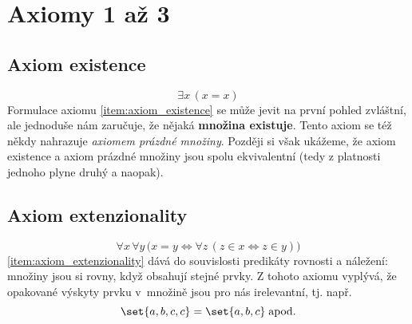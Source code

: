 \section{Axiomy 1 až 3}\label{sec:axiomy_1_az_3}
\subsection{Axiom existence}
\begin{equation*}
    \exists x\,(x=x)
\end{equation*}
Formulace axiomu \ref{item:axiom_existence} se může jevit na první pohled zvláštní, ale jednoduše nám zaručuje, že nějaká \textbf{množina existuje}. Tento axiom se též někdy nahrazuje \emph{axiomem prázdné množiny}. Později si však ukážeme, že axiom existence a axiom prázdné množiny jsou spolu ekvivalentní (tedy z platnosti jednoho plyne druhý a naopak).

\subsection{Axiom extenzionality}
\begin{equation*}
    \forall x\,\forall y\,\bigl(x=y \iff \forall z\,(z\in x \iff z\in y)\bigr)
\end{equation*}
\ref{item:axiom_extenzionality} dává do souvislosti predikáty rovnosti a náležení: množiny jsou si rovny, když obsahují stejné prvky. Z tohoto axiomu vyplývá, že opakované výskyty prvku v~množině jsou pro nás irelevantní, tj. např.
\begin{equation*}
    \set{a,b,c,c}=\set{a,b,c}\;\text{apod.}
\end{equation*}

